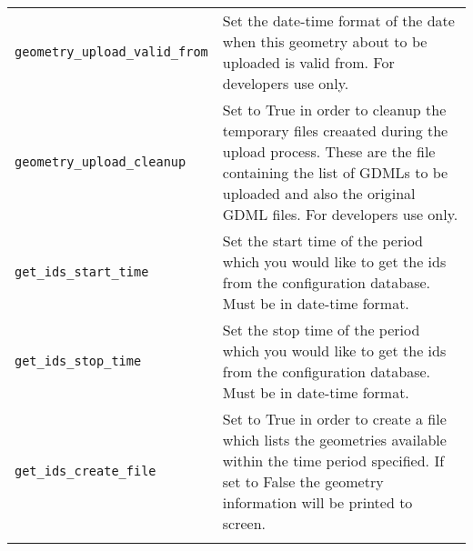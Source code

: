 \begin{table*}
\begin{center}
\begin{tabularx}{\textwidth}{lX}
\verb|geometry_upload_valid_from| & Set the date-time format of the date when this geometry about to be uploaded is valid from. For developers use
only.\\
\verb|geometry_upload_cleanup| & Set to True in order to cleanup the temporary files creaated during the upload process. These are the file
containing the list of GDMLs to be uploaded and also the original GDML files. For developers use only.\\
\verb|get_ids_start_time| & Set the start time of the period which you would like to get the ids from the configuration database. Must be in
date-time format.\\
\verb|get_ids_stop_time| & Set the stop time of the period which you would like to get the ids from the configuration database. Must be in
date-time format.\\
\verb|get_ids_create_file| & Set to True in order to create a file which lists the geometries available within the time period specified. If set to
False the geometry information will be printed to screen.\\
\begin{makeimage} %
\end{makeimage} 
\end{tabularx}
\end{center}
\end{table*}
